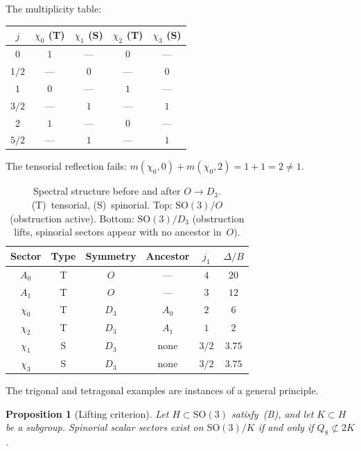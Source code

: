 \documentclass[12pt]{article}
\newtheorem{proposition}[theorem]{Proposition}
\theoremstyle{definition}
\theoremstyle{remark}
\newcommand{\SO}{\mathrm{SO}}
\begin{document}
\noindent
The multiplicity table:

\begin{center}
\begin{tabular}{@{}ccccc@{}}
  \toprule
  $j$ & $\chi_0$ (T) & $\chi_1$ (S) & $\chi_2$ (T) & $\chi_3$ (S) \\
  \midrule
  $0$   & $1$ & ---  & $0$ & ---  \\
  $1/2$ & --- & $0$  & --- & $0$  \\
  $1$   & $0$ & ---  & $1$ & ---  \\
  $3/2$ & --- & $1$  & --- & $1$  \\
  $2$   & $1$ & ---  & $0$ & ---  \\
  $5/2$ & --- & $1$  & --- & $1$  \\
  \bottomrule
\end{tabular}
\end{center}

\noindent
The tensorial reflection fails:
$m(\chi_0, 0) + m(\chi_0, 2) = 1 + 1 = 2 \neq 1$.

\begin{table}[ht]
\centering
\begin{tabular}{@{}cccccc@{}}
  \toprule
  Sector & Type & Symmetry & Ancestor & $j_1$ & $\Delta/B$ \\
  \midrule
  $A_0$ & T & $O$   & ---       & $4$   & $20$ \\
  $A_1$ & T & $O$   & ---       & $3$   & $12$ \\
  \midrule
  $\chi_0$ & T & $D_3$ & $A_0$  & $2$   & $6$ \\
  $\chi_2$ & T & $D_3$ & $A_1$  & $1$   & $2$ \\
  $\chi_1$ & S & $D_3$ & none   & $3/2$ & $3.75$ \\
  $\chi_3$ & S & $D_3$ & none   & $3/2$ & $3.75$ \\
  \bottomrule
\end{tabular}
\caption{Spectral structure before and after $O \to D_3$.
  (T)~tensorial, (S)~spinorial.
  Top: $\SO(3)/O$ (obstruction active).
  Bottom: $\SO(3)/D_3$ (obstruction lifts, spinorial sectors
  appear with no ancestor in~$O$).}
\label{tab:densification}
\end{table}

The trigonal and tetragonal examples are instances of a general
principle.

\begin{proposition}[Lifting criterion]
  \label{prop:lifting}
  Let $H \subset \SO(3)$ satisfy~\textup{(B)}, and let
  $K \subset H$ be a subgroup.
  Spinorial scalar sectors exist on $\SO(3)/K$ if and only
  if $Q_8 \not\subset 2K$.
\end{proposition}
\end{document}
